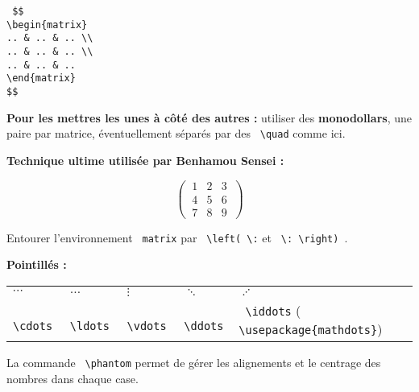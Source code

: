 \documentclass{report}
\begin{document}
\texttt{
\$\$ \\
\textbackslash{}begin\{matrix\} \\
.. \& .. \& .. \textbackslash{}\textbackslash{} \\
.. \& .. \& .. \textbackslash{}\textbackslash{} \\
.. \& .. \& .. \\
\textbackslash{}end\{matrix\} \\
\$\$
} 
\bigskip

\textbf{Pour les mettres les unes à côté des autres :} utiliser des \textbf{monodollars}, une paire par matrice, éventuellement séparés par des \texttt{ \textbackslash{}quad} comme ici.

\textbf{Technique ultime utilisée par Benhamou Sensei :}

$$ \left( \: \begin{matrix} 1 & 2 & 3 \\ 4 & 5 & 6 \\ 7 & 8 & 9 \end{matrix} \: \right) $$

Entourer l'environnement \texttt{ matrix} par \texttt{ \textbackslash{}left( \textbackslash{}\!\!\!:} et 
\texttt{ \textbackslash{}\!\!\!: \textbackslash{}right) }.

\textbf{Pointillés :}

\begin{tabular}{lllll}
$ \cdots $ & $ \ldots $ & $ \vdots $ & $ \ddots $ & $ \iddots $ \\
\texttt{ \textbackslash{}cdots } & \texttt{ \textbackslash{}ldots } & \texttt{ \textbackslash{}vdots } & \texttt{ \textbackslash{}ddots} & \texttt{ \textbackslash{}iddots} (\texttt{ \textbackslash{}usepackage\{mathdots\}})
\end{tabular}

La commande \texttt{ \textbackslash{}phantom} permet de gérer les alignements et le centrage des nombres dans chaque case.


\end{document}
